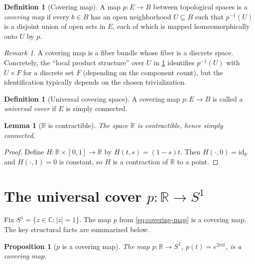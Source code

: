 \documentclass[11pt,a4paper]{article}
\newtheorem{lemma}[theorem]{Lemma}
\newtheorem{proposition}[theorem]{Proposition}
\theoremstyle{definition}
\newtheorem{definition}[theorem]{Definition}
\theoremstyle{remark}
\newtheorem{remark}[theorem]{Remark}
\begin{document}
\begin{definition}[Covering map]
\label{def:covering-map}
A map \(p:E\to B\) between topological spaces is a \emph{covering map} if every \(b\in B\) has an open neighborhood \(U\subseteq B\) such that \(p^{-1}(U)\) is a disjoint union of open sets in \(E\), each of which is mapped homeomorphically onto \(U\) by \(p\).
\end{definition}

\begin{remark}
\label{rem:covering-is-fiber-bundle}
A covering map is a fiber bundle whose fiber is a discrete space. Concretely, the ``local product structure'' over \(U\) in \cref{def:covering-map} identifies \(p^{-1}(U)\) with \(U\times F\) for a discrete set \(F\) (depending on the component count), but the identification typically depends on the chosen trivialization.
\end{remark}

\begin{definition}[Universal covering space]
\label{def:universal-cover}
A covering map \(p:E\to B\) is called a \emph{universal cover} if \(E\) is simply connected.
\end{definition}

\begin{lemma}[\(\mathbb{R}\) is contractible]
\label{lem:R-contractible}
The space \(\mathbb{R}\) is contractible, hence simply connected.
\end{lemma}

\begin{proof}
Define \(H:\mathbb{R}\times [0,1]\to \mathbb{R}\) by \(H(t,s)=(1-s)t\). Then \(H(\cdot,0)=\mathrm{id}_{\mathbb{R}}\) and \(H(\cdot,1)=0\) is constant, so \(H\) is a contraction of \(\mathbb{R}\) to a point.
\end{proof}

\section{The universal cover \(p:\mathbb{R}\to S^{1}\)}
\label{sec:universal-cover}

Fix \(S^{1}=\{z\in \mathbb{C}:\lvert z\rvert=1\}\). The map \(p\) from \cref{eq:covering-map} is a covering map. The key structural facts are summarized below.

\begin{proposition}[\(p\) is a covering map]
\label{prop:p-is-covering}
The map \(p:\mathbb{R}\to S^{1}\), \(p(t)=e^{2\pi i t}\), is a covering map.
\end{proposition}
\end{document}
